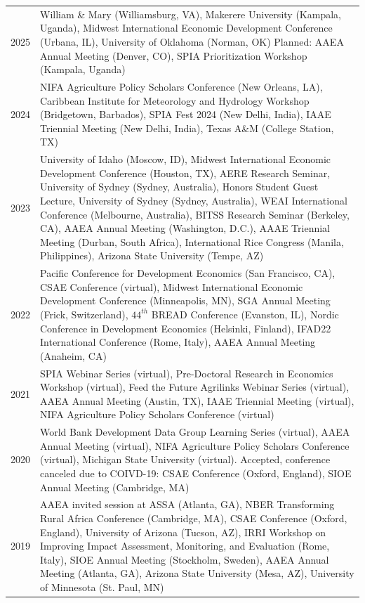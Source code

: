 \documentclass[letterpaper]{article}
\renewenvironment{itemize}{
  \begin{list}
  	{}{
    \setlength{\leftmargin}{1.5em}
    \setlength{\itemsep}{-.5em}
  }
}{
  \end{list}
}
\begin{document}
\begin{itemize}
\begin{tabular}{lp{.92\linewidth}}
	2025	& William \& Mary (Williamsburg, VA), Makerere University (Kampala, Uganda), Midwest International Economic Development Conference (Urbana, IL), University of Oklahoma (Norman, OK) Planned: AAEA Annual Meeting (Denver, CO), SPIA Prioritization Workshop (Kampala, Uganda)  \\
	2024	& NIFA Agriculture Policy Scholars Conference (New Orleans, LA), Caribbean Institute for Meteorology and Hydrology Workshop (Bridgetown, Barbados), SPIA Fest 2024 (New Delhi, India), IAAE Triennial Meeting (New Delhi, India), Texas A\&M (College Station, TX)  \\
	2023	& University of Idaho (Moscow, ID), Midwest International Economic Development Conference (Houston, TX), AERE Research Seminar, University of Sydney (Sydney, Australia), Honors Student Guest Lecture, University of Sydney (Sydney, Australia), WEAI International Conference (Melbourne, Australia), BITSS Research Seminar (Berkeley, CA), AAEA Annual Meeting (Washington, D.C.),  AAAE Triennial Meeting (Durban, South Africa), International Rice Congress (Manila, Philippines), Arizona State University (Tempe, AZ)  \\
	2022	& Pacific Conference for Development Economics (San Francisco, CA), CSAE Conference (virtual), Midwest International Economic Development Conference (Minneapolis, MN), SGA Annual Meeting (Frick, Switzerland), $44^{th}$ BREAD Conference (Evanston, IL), Nordic Conference in Development Economics (Helsinki, Finland), IFAD22 International Conference (Rome, Italy), AAEA Annual Meeting (Anaheim, CA)  \\
	2021	& SPIA Webinar Series (virtual), Pre-Doctoral Research in Economics Workshop (virtual), Feed the Future Agrilinks Webinar Series (virtual), AAEA Annual Meeting (Austin, TX), IAAE Triennial Meeting (virtual), NIFA Agriculture Policy Scholars Conference (virtual)  \\
    2020	& World Bank Development Data Group Learning Series (virtual), AAEA Annual Meeting (virtual), NIFA Agriculture Policy Scholars Conference (virtual), Michigan State University (virtual). Accepted, conference canceled due to COIVD-19: CSAE Conference (Oxford, England), SIOE Annual Meeting (Cambridge, MA) \\
	2019	& AAEA invited session at ASSA (Atlanta, GA), NBER Transforming Rural Africa Conference (Cambridge, MA), CSAE Conference (Oxford, England), University of Arizona (Tucson, AZ), IRRI Workshop on Improving Impact Assessment, Monitoring, and Evaluation (Rome, Italy), SIOE Annual Meeting (Stockholm, Sweden), AAEA Annual Meeting (Atlanta, GA), Arizona State University (Mesa, AZ), University of Minnesota (St. Paul, MN)  \\

\end{tabular}
\end{itemize}
\end{document}
